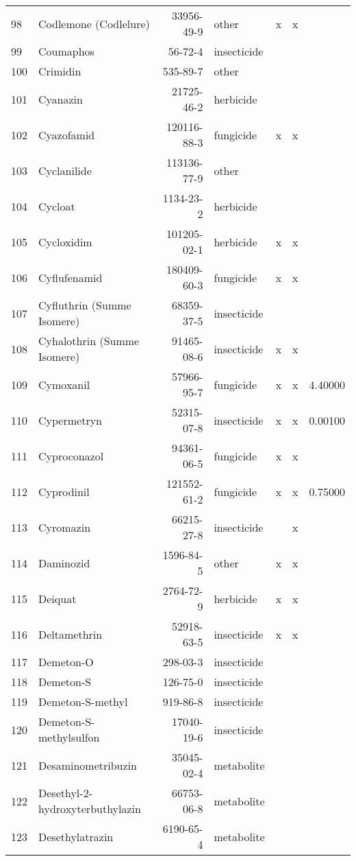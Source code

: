 \begin{longtable}{lp{4cm}rlp{1.3cm}p{1.3cm}p{1.5cm}}
  98 & Codlemone (Codlelure) & 33956-49-9 & other & x & x &  \\ 
  99 & Coumaphos & 56-72-4 & insecticide &  &  &  \\ 
  100 & Crimidin & 535-89-7 & other &  &  &  \\ 
  101 & Cyanazin & 21725-46-2 & herbicide &  &  &  \\ 
  102 & Cyazofamid & 120116-88-3 & fungicide & x & x &  \\ 
  103 & Cyclanilide & 113136-77-9 & other &  &  &  \\ 
  104 & Cycloat & 1134-23-2 & herbicide &  &  &  \\ 
  105 & Cycloxidim & 101205-02-1 & herbicide & x & x &  \\ 
  106 & Cyflufenamid & 180409-60-3 & fungicide & x & x &  \\ 
  107 & Cyfluthrin (Summe Isomere) & 68359-37-5 & insecticide &  &  &  \\ 
  108 & Cyhalothrin (Summe Isomere) & 91465-08-6 & insecticide & x & x &  \\ 
  109 & Cymoxanil & 57966-95-7 & fungicide & x & x & 4.40000 \\ 
  110 & Cypermetryn & 52315-07-8 & insecticide & x & x & 0.00100 \\ 
  111 & Cyproconazol & 94361-06-5 & fungicide & x & x &  \\ 
  112 & Cyprodinil & 121552-61-2 & fungicide & x & x & 0.75000 \\ 
  113 & Cyromazin & 66215-27-8 & insecticide &  & x &  \\ 
  114 & Daminozid & 1596-84-5 & other & x & x &  \\ 
  115 & Deiquat & 2764-72-9 & herbicide & x & x &  \\ 
  116 & Deltamethrin & 52918-63-5 & insecticide & x & x &  \\ 
  117 & Demeton-O & 298-03-3 & insecticide &  &  &  \\ 
  118 & Demeton-S & 126-75-0 & insecticide &  &  &  \\ 
  119 & Demeton-S-methyl & 919-86-8 & insecticide &  &  &  \\ 
  120 & Demeton-S-methylsulfon & 17040-19-6 & insecticide &  &  &  \\ 
  121 & Desaminometribuzin & 35045-02-4 & metabolite &  &  &  \\ 
  122 & Desethyl-2-hydroxyterbuthylazin & 66753-06-8 & metabolite &  &  &  \\ 
  123 & Desethylatrazin & 6190-65-4 & metabolite &  &  &  \\ 

\end{longtable}
